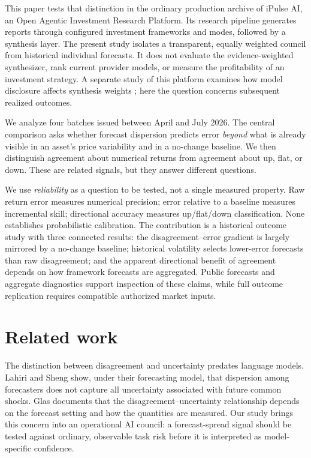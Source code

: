 \documentclass[11pt]{article}
\begin{document}
This paper tests that distinction in the ordinary production archive of iPulse AI, an Open Agentic Investment Research Platform. Its research pipeline generates reports through configured investment frameworks and modes, followed by a synthesis layer. The present study isolates a transparent, equally weighted council from historical individual forecasts. It does not evaluate the evidence-weighted synthesizer, rank current provider models, or measure the profitability of an investment strategy. A separate study of this platform examines how model disclosure affects synthesis weights \cite{ramdowar2026}; here the question concerns subsequent realized outcomes.

We analyze four batches issued between April and July 2026. The central comparison asks whether forecast dispersion predicts error \emph{beyond} what is already visible in an asset's price variability and in a no-change baseline. We then distinguish agreement about numerical returns from agreement about up, flat, or down. These are related signals, but they answer different questions.

We use \emph{reliability} as a question to be tested, not a single measured property. Raw return error measures numerical precision; error relative to a baseline measures incremental skill; directional accuracy measures up/flat/down classification. None establishes probabilistic calibration. The contribution is a historical outcome study with three connected results: the disagreement--error gradient is largely mirrored by a no-change baseline; historical volatility selects lower-error forecasts than raw disagreement; and the apparent directional benefit of agreement depends on how framework forecasts are aggregated. Public forecasts and aggregate diagnostics support inspection of these claims, while full outcome replication requires compatible authorized market inputs.

\section{Related work}
The distinction between disagreement and uncertainty predates language models. Lahiri and Sheng \cite{lahiri2010} show, under their forecasting model, that dispersion among forecasters does not capture all uncertainty associated with future common shocks. Glas \cite{glas2020} documents that the disagreement--uncertainty relationship depends on the forecast setting and how the quantities are measured. Our study brings this concern into an operational AI council: a forecast-spread signal should be tested against ordinary, observable task risk before it is interpreted as model-specific confidence.
\end{document}
